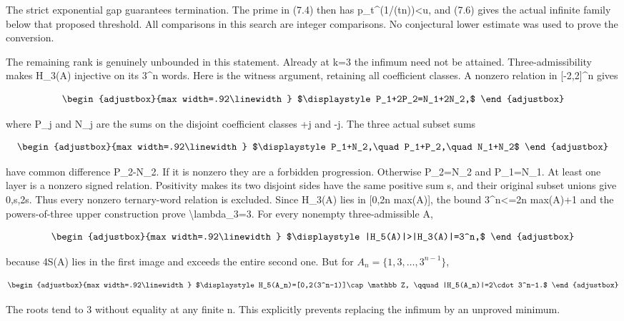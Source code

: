 The strict exponential gap guarantees termination. The prime in (7.4) then has p\_t\^{}(1/(tn))\textless u, and (7.6) gives the actual infinite family below that proposed threshold. All comparisons in this search are integer comparisons. No conjectural lower estimate was used to prove the conversion.

The remaining rank is genuinely unbounded in this statement. Already at k=3 the infimum need not be attained. Three-admissibility makes H\_3(A) injective on its 3\^{}n words. Here is the witness argument, retaining all coefficient classes. A nonzero relation in {[}-2,2{]}\^{}n gives

\[
\begin{adjustbox}{max width=.92\linewidth}
$\displaystyle P_1+2P_2=N_1+2N_2,$
\end{adjustbox}
\]

where P\_j and N\_j are the sums on the disjoint coefficient classes +j and -j. The three actual subset sums

\[
\begin{adjustbox}{max width=.92\linewidth}
$\displaystyle P_1+N_2,\quad P_1+P_2,\quad N_1+N_2$
\end{adjustbox}
\]

have common difference P\_2-N\_2. If it is nonzero they are a forbidden progression. Otherwise P\_2=N\_2 and P\_1=N\_1. At least one layer is a nonzero signed relation. Positivity makes its two disjoint sides have the same positive sum s, and their original subset unions give 0,s,2s. Thus every nonzero ternary-word relation is excluded. Since H\_3(A) lies in {[}0,2n max(A){]}, the bound 3\^{}n\textless=2n max(A)+1 and the powers-of-three upper construction prove \textbackslash lambda\_3=3. For every nonempty three-admissible A,

\[
\begin{adjustbox}{max width=.92\linewidth}
$\displaystyle |H_5(A)|>|H_3(A)|=3^n,$
\end{adjustbox}
\]

because 4S(A) lies in the first image and exceeds the entire second one. But for \(A_n=\{1,3,\ldots,3^{n-1}\}\),

\[
\begin{adjustbox}{max width=.92\linewidth}
$\displaystyle H_5(A_n)=[0,2(3^n-1)]\cap\mathbb Z,
\qquad |H_5(A_n)|=2\cdot3^n-1.$
\end{adjustbox}
\]

The roots tend to 3 without equality at any finite n. This explicitly prevents replacing the infimum by an unproved minimum.

